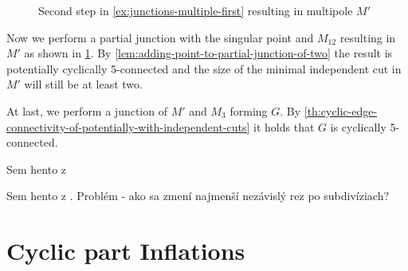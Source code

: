 \documentclass[12pt, twoside]{book}
\begin{document}
\begin{example}
\begin{figure}
		\caption{Second step in \cref{ex:junctions-multiple-first} resulting in multipole $M'$}
		\label{fig:3-5-poles-connected-step-2}
	\end{figure}
	
	Now we perform a partial junction with the singular point and $M_{12}$ resulting in $M'$ as shown in \cref{fig:3-5-poles-connected-step-2}. By \cref{lem:adding-point-to-partial-junction-of-two} the result is potentially cyclically 5-connected and the size of the minimal independent cut in $M'$ will still be at least two.
	
	At last, we perform a junction of $M'$ and $M_3$ forming $G$. By \cref{th:cyclic-edge-connectivity-of-potentially-with-independent-cuts} it holds that $G$ is cyclically 5-connected.
\end{example}

\begin{example}
	Sem hento z \cite{Macajova2006}
\end{example}

\begin{example}
	Sem hento z \cite{Kochol1996}. Problém - ako sa zmení najmenší nezávislý rez po subdivíziach?
\end{example}

\chapter{Cyclic part Inflations}\label{ch:cyclic-part-inflations}
\end{document}
